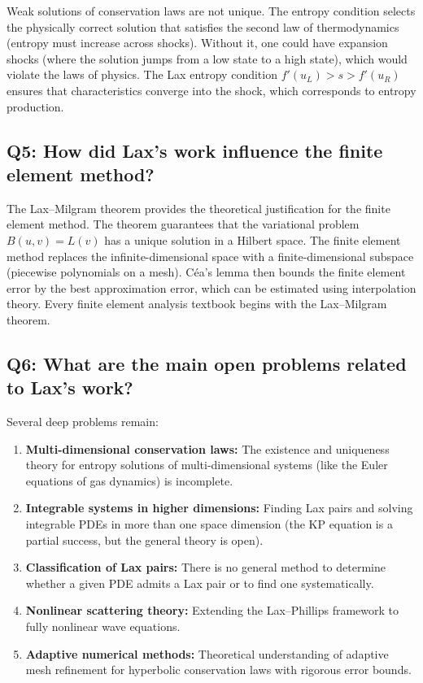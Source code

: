Weak solutions of conservation laws are not unique. The entropy condition selects the physically correct solution that satisfies the second law of thermodynamics (entropy must increase across shocks). Without it, one could have expansion shocks (where the solution jumps from a low state to a high state), which would violate the laws of physics. The Lax entropy condition \(f'(u_L) > s > f'(u_R)\) ensures that characteristics converge into the shock, which corresponds to entropy production.

\subsection*{Q5: How did Lax's work influence the finite element method?}

The Lax--Milgram theorem provides the theoretical justification for the finite element method. The theorem guarantees that the variational problem \(B(u,v) = L(v)\) has a unique solution in a Hilbert space. The finite element method replaces the infinite-dimensional space with a finite-dimensional subspace (piecewise polynomials on a mesh). C\'ea's lemma then bounds the finite element error by the best approximation error, which can be estimated using interpolation theory. Every finite element analysis textbook begins with the Lax--Milgram theorem.

\subsection*{Q6: What are the main open problems related to Lax's work?}

Several deep problems remain:
\begin{enumerate}
    \item \textbf{Multi-dimensional conservation laws:} The existence and uniqueness theory for entropy solutions of multi-dimensional systems (like the Euler equations of gas dynamics) is incomplete.
    \item \textbf{Integrable systems in higher dimensions:} Finding Lax pairs and solving integrable PDEs in more than one space dimension (the KP equation is a partial success, but the general theory is open).
    \item \textbf{Classification of Lax pairs:} There is no general method to determine whether a given PDE admits a Lax pair or to find one systematically.
    \item \textbf{Nonlinear scattering theory:} Extending the Lax--Phillips framework to fully nonlinear wave equations.
    \item \textbf{Adaptive numerical methods:} Theoretical understanding of adaptive mesh refinement for hyperbolic conservation laws with rigorous error bounds.
\end{enumerate}

